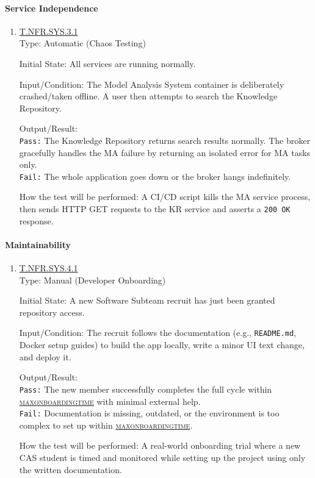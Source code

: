 \documentclass[12pt, titlepage]{article}
\newcommand{\testdef}[1]{\leavevmode\hypertarget{test:#1}{}\hyperlink{trace:#1}{#1}}
\DeclareRobustCommand{\cname}[1]{{\renewcommand{\_}{\textunderscore\allowbreak}\textsc{#1}}}
\newcommand{\constfirst}[1]{\leavevmode\hypertarget{constfirst:\detokenize{#1}}{}\hyperlink{const:\detokenize{#1}}{\cname{#1}}}
\newcommand{\const}[1]{\hyperlink{const:\detokenize{#1}}{\cname{#1}}}
\begin{document}
\paragraph{Service Independence}
\begin{enumerate}
  \item \testdef{T.NFR.SYS.3.1}\\
  Type: Automatic (Chaos Testing)

  Initial State: All services are running normally.

  Input/Condition: The Model Analysis System container is deliberately crashed/taken offline. A user then attempts to search the Knowledge Repository.

  Output/Result: \\
  \texttt{Pass:} The Knowledge Repository returns search results normally. The broker gracefully handles the MA failure by returning an isolated error for MA tasks only.\\
  \texttt{Fail:} The whole application goes down or the broker hangs indefinitely.

  How the test will be performed: A CI/CD script kills the MA service process, then sends HTTP GET requests to the KR service and asserts a \texttt{200 OK} response.
\end{enumerate}

\paragraph{Maintainability}
\begin{enumerate}
  \item \testdef{T.NFR.SYS.4.1}\\
  Type: Manual (Developer Onboarding)

  Initial State: A new Software Subteam recruit has just been granted repository access.

  Input/Condition: The recruit follows the documentation (e.g., \texttt{README.md}, Docker setup guides) to build the app locally, write a minor UI text change, and deploy it.

  Output/Result: \\
  \texttt{Pass:} The new member successfully completes the full cycle within \constfirst{max\_onboarding\_time} with minimal external help.\\
  \texttt{Fail:} Documentation is missing, outdated, or the environment is too complex to set up within \const{max\_onboarding\_time}.

  How the test will be performed: A real-world onboarding trial where a new CAS student is timed and monitored while setting up the project using only the written documentation.
\end{enumerate}
\end{document}
